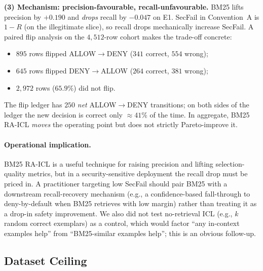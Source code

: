 \documentclass[10pt,a4paper,twocolumn]{article}
\begin{document}
\textbf{(3) Mechanism: precision-favourable, recall-unfavourable.} BM25 lifts precision by $+0.190$ and \emph{drops} recall by $-0.047$ on E1. SecFail in Convention~A is $1-R$ (on the illegitimate slice), so recall drops mechanically increase SecFail. A paired flip analysis on the $4{,}512$-row cohort makes the trade-off concrete:
\begin{itemize}
  \item $895$ rows flipped ALLOW$\to$DENY ($341$ correct, $554$ wrong);
  \item $645$ rows flipped DENY$\to$ALLOW ($264$ correct, $381$ wrong);
  \item $2{,}972$ rows ($65.9\%$) did not flip.
\end{itemize}
The flip ledger has $250$ \emph{net} ALLOW$\to$DENY transitions; on both sides of the ledger the new decision is correct only $\approx 41\%$ of the time. In aggregate, BM25 RA-ICL \emph{moves} the operating point but does not strictly Pareto-improve it.

\paragraph{Operational implication.} BM25 RA-ICL is a useful technique for raising precision and lifting selection-quality metrics, but in a security-sensitive deployment the recall drop must be priced in. A practitioner targeting low SecFail should pair BM25 with a downstream recall-recovery mechanism (e.g., a confidence-based fall-through to deny-by-default when BM25 retrieves with low margin) rather than treating it as a drop-in safety improvement. We also did not test no-retrieval ICL (e.g., $k$ random correct exemplars) as a control, which would factor ``any in-context examples help'' from ``BM25-similar examples help''; this is an obvious follow-up.

\subsection{Dataset Ceiling}
\label{sec:ceiling}
\end{document}
